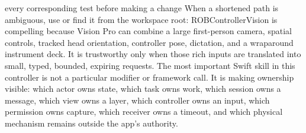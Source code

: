 every corresponding test before making a change\markdownRendererOlItemEnd 
\markdownRendererOlEnd \markdownRendererInterblockSeparator
{}When a shortened path is ambiguous, use  or find it from the workspace root:\markdownRendererInterblockSeparator
{}\markdownRendererInterblockSeparator
{}
\markdownRendererSectionEnd \markdownRendererSectionBegin
{}\markdownRendererInterblockSeparator
{}ROBControllerVision is compelling because Vision Pro can combine a large first-person camera, spatial controls, tracked head orientation, controller pose, dictation, and a wraparound instrument deck. It is trustworthy only when those rich inputs are translated into small, typed, bounded, expiring requests.\markdownRendererParagraphSeparator
{}The most important Swift skill in this controller is not a particular modifier or framework call. It is making ownership visible: which actor owns state, which task owns work, which session owns a message, which view owns a layer, which controller owns an input, which permission owns capture, which receiver owns a timeout, and which physical mechanism remains outside the app's authority.
\markdownRendererSectionEnd \markdownRendererDocumentEnd